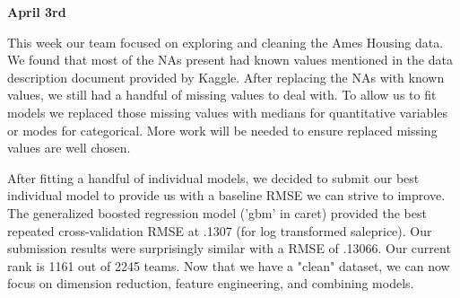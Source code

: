 \documentclass[12pt]{article}
\begin{document}
\newpage
\textbf{April 3rd}

This week our team focused on exploring and cleaning the Ames Housing data. We found that most of the NAs present had known values mentioned in the data description document provided by Kaggle. After replacing the NAs with known values, we still had a handful of missing values to deal with. To allow us to fit models we replaced those missing values with medians for quantitative variables or modes for categorical. More work will be needed to ensure replaced missing values are well chosen.

After fitting a handful of individual models, we decided to submit our best individual model to provide us with a baseline RMSE we can strive to improve. The generalized boosted regression model ('gbm' in caret) provided the best repeated cross-validation RMSE at .1307 (for log transformed saleprice). Our submission results were surprisingly similar with a RMSE of .13066. Our current rank is 1161 out of 2245 teams. Now that we have a "clean" dataset, we can now focus on dimension reduction, feature engineering, and combining models.
\end{document}
